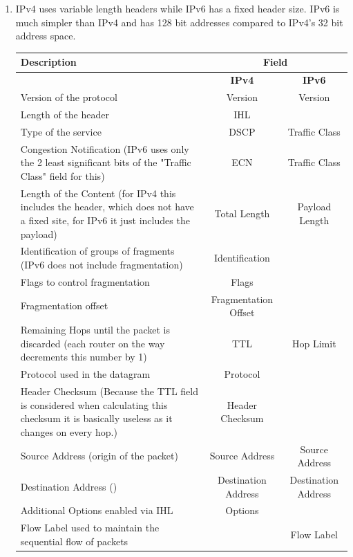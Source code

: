 \documentclass[12pt, a4paper]{article}
\begin{document}
\section{} %
\begin{enumerate}[1]
	\item %
	IPv4 uses variable length headers while IPv6 has a fixed header size. IPv6 is much simpler than IPv4 and has 128 bit addresses compared to IPv4's 32 bit address space.

	\begin{tabular}{|p{18em}|c|c|}
		\hline
		\textbf{Description} & \multicolumn{2}{|c|}{\textbf{Field}}\\\hline
		& \textbf{IPv4} & \textbf{IPv6}\\\hline
		Version of the protocol & Version & Version\\\hline
		Length of the header & IHL &\\\hline
		Type of the service & DSCP & Traffic Class\\\hline
		Congestion Notification (IPv6 uses only the 2 least significant bits of the "Traffic Class" field for this) & ECN & Traffic Class\\\hline
		Length of the Content (for IPv4 this includes the header, which does not have a fixed site, for IPv6 it just includes the payload) & Total Length & Payload Length\\\hline
		Identification of groups of fragments (IPv6 does not include fragmentation) & Identification &\\\hline
		Flags to control fragmentation & Flags &\\\hline
		Fragmentation offset & Fragmentation Offset &\\\hline
		Remaining Hops until the packet is discarded (each router on the way decrements this number by 1) & TTL & Hop Limit\\\hline
		Protocol used in the datagram & Protocol &\\\hline
		Header Checksum (Because the TTL field is considered when calculating this checksum it is basically useless as it changes on every hop.) & Header Checksum &\\\hline
		Source Address (origin of the packet) & Source Address & Source Address\\\hline
		Destination Address () & Destination Address & Destination Address\\\hline
		Additional Options enabled via IHL & Options &\\\hline
		Flow Label used to maintain the sequential flow of packets && Flow Label\\\hline
	\end{tabular}


\end{enumerate}
\end{document}
